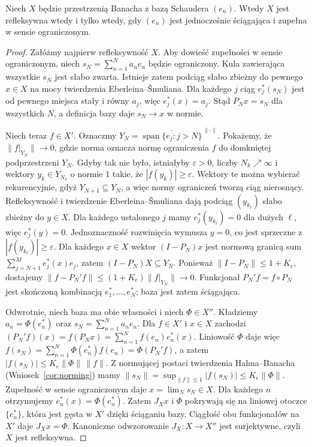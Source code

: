 \begin{twierdzenie}
\label{thm:james-basis27}
Niech $X$ będzie przestrzenią Banacha z bazą Schaudera $(e_n)$.
Wtedy $X$ jest refleksywna wtedy i tylko wtedy, gdy
$(e_n)$ jest jednocześnie ściągająca i zupełna w sensie
ograniczonym.
\end{twierdzenie}
\begin{proof}
Załóżmy najpierw refleksywność $X$.
Aby dowieść zupełności w sensie ograniczonym,
niech $s_N=\sum_{n=1}^Na_ne_n$ będzie ograniczony.
Kula zawierająca wszystkie $s_N$ jest słabo zwarta.
Istnieje zatem podciąg słabo zbieżny do pewnego $x\in X$
na mocy twierdzenia Eberleina--\v Smuliana.
Dla każdego $j$ ciąg $e_j^*(s_N)$ jest od pewnego miejsca
stały i równy $a_j$, więc $e_j^*(x)=a_j$.
Stąd $P_Nx=s_N$ dla wszystkich $N$, a definicja bazy
daje $s_N\to x$ w normie.

Niech teraz $f\in X'$. Oznaczmy
$Y_N=\overline{\operatorname{span}\{e_j:j>N\}}^{\,\|\cdot\|}$.
Pokażemy, że $\|f|_{Y_N}\|\to0$, gdzie norma oznacza
normę ograniczenia $f$ do domkniętej podprzestrzeni $Y_N$.
Gdyby tak nie było, istniałyby $\varepsilon>0$, liczby
$N_k\nearrow\infty$ i wektory $y_k\in Y_{N_k}$
o normie $1$ takie, że $|f(y_k)|\ge\varepsilon$.
Wektory te można wybierać rekurencyjnie, gdyż $Y_{N+1}\subseteq Y_N$,
a więc normy ograniczeń tworzą ciąg nierosnący.
Refleksywność i twierdzenie Eberleina--\v Smuliana
dają podciąg $(y_{k_\ell})$ słabo zbieżny do $y\in X$.
Dla każdego ustalonego $j$ mamy
$e_j^*(y_{k_\ell})=0$ dla dużych $\ell$, więc $e_j^*(y)=0$.
Jednoznaczność rozwinięcia wymusza $y=0$,
co jest sprzeczne z $|f(y_{k_\ell})|\ge\varepsilon$.
Dla każdego $x\in X$ wektor $(I-P_N)x$ jest normową
granicą sum $\sum_{j=N+1}^M e_j^*(x)e_j$, zatem
$(I-P_N)X\subseteq Y_N$. Ponieważ $\|I-P_N\|\le1+K_e$,
dostajemy $\|f-P_N'f\|\le(1+K_e)\|f|_{Y_N}\|\to0$.
Funkcjonał $P_N'f=f\circ P_N$ jest skończoną kombinacją
$e_1^*,\ldots,e_N^*$; baza jest zatem ściągająca.

Odwrotnie, niech baza ma obie własności i niech
$\Phi\in X''$. Kładziemy $a_n=\Phi(e_n^*)$ oraz
$s_N=\sum_{n=1}^Na_ne_n$. Dla $f\in X'$ i $x\in X$ zachodzi
$(P_N'f)(x)=f(P_Nx)=\sum_{n=1}^N f(e_n)e_n^*(x)$.
Liniowość $\Phi$ daje więc
$f(s_N)=\sum_{n=1}^N\Phi(e_n^*)f(e_n)=\Phi(P_N'f)$, a zatem
$|f(s_N)|\le K_e\|\Phi\|\,\|f\|$.
Z normującej postaci twierdzenia Hahna--Banacha
(Wniosek~\ref{cor:norming}) mamy
$\|s_N\|=\sup_{\|f\|\le1}|f(s_N)|\le K_e\|\Phi\|$.
Zupełność w sensie ograniczonym daje
$x=\lim_Ns_N\in X$. Dla każdego $n$ otrzymujemy
$e_n^*(x)=\Phi(e_n^*)$.
Zatem $J_Xx$ i $\Phi$ pokrywają się na liniowej otoczce
$\{e_n^*\}$, która jest gęsta w $X'$ dzięki ściąganiu bazy.
Ciągłość obu funkcjonałów na $X'$ daje $J_Xx=\Phi$.
Kanoniczne odwzorowanie $J_X:X\to X''$ jest surjektywne,
czyli $X$ jest refleksywna.
\end{proof}

